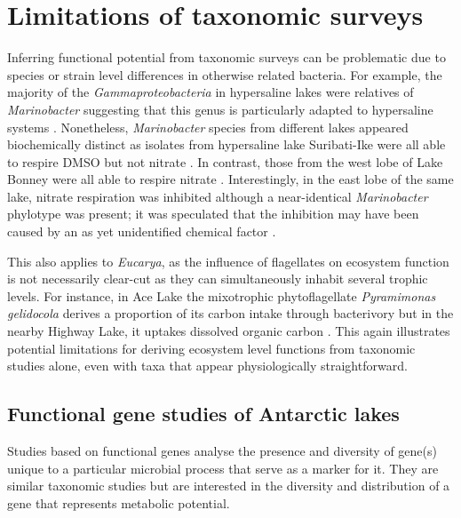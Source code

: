 \section{Limitations of taxonomic surveys}
\label{in:pcrlimits}

Inferring functional potential from taxonomic surveys can be problematic due to species or strain level differences in otherwise related bacteria.
For example, the majority of the \emph{Gammaproteobacteria} in hypersaline lakes were relatives of \emph{Marinobacter} suggesting that this genus is particularly adapted to hypersaline systems
\cite{Bowman2000b, Glatz2006, Matsuzaki2006, Mosier2007}.
Nonetheless, \emph{Marinobacter} species from different lakes appeared biochemically distinct
 as isolates from hypersaline lake Suribati-Ike were all able to respire \ac{DMSO} but not nitrate \cite{Matsuzaki2006}. 
In contrast, those from the west lobe of Lake Bonney were all able to respire nitrate \cite{Ward1997}. 
Interestingly, in the east lobe of the same lake, nitrate respiration was inhibited although a near-identical \emph{Marinobacter} phylotype was present; 
it was speculated that the inhibition may have been caused by an as yet unidentified chemical factor \cite{Ward2005, Glatz2006}. 

This also applies to \emph{Eucarya}, as the influence of flagellates on ecosystem function is not necessarily clear-cut as they can simultaneously inhabit several trophic levels. 
For instance, in Ace Lake the mixotrophic phytoflagellate \emph{Pyramimonas gelidocola} derives a proportion of its carbon intake through bacterivory \cite{Bell2003} 
but in the nearby Highway Lake, it uptakes dissolved organic carbon \cite{Laybourn-Parry2005}. 
This again illustrates potential limitations for deriving ecosystem level functions from taxonomic studies alone, even with taxa that appear physiologically straightforward. 

\subsection{Functional gene studies of Antarctic lakes}

Studies based on functional genes analyse the presence and diversity of gene(s) unique to a particular microbial process that serve as a marker for it.
They are similar taxonomic studies but are interested in the diversity and distribution of a gene that represents metabolic potential.

